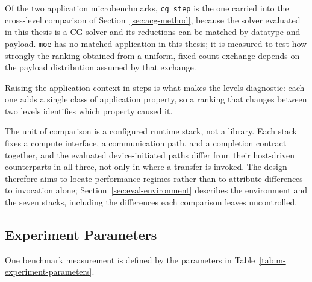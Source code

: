 Of the two application microbenchmarks, \texttt{cg\_step} is the one carried into the cross-level comparison of Section~\ref{sec:acg-method}, because the solver evaluated in this thesis is a CG solver and its reductions can be matched by datatype and payload. \texttt{moe} has no matched application in this thesis; it is measured to test how strongly the ranking obtained from a uniform, fixed-count exchange depends on the payload distribution assumed by that exchange.

Raising the application context in steps is what makes the levels diagnostic: each one adds a single class of application property, so a ranking that changes between two levels identifies which property caused it.

The unit of comparison is a configured runtime stack, not a library. Each stack fixes a compute interface, a communication path, and a completion contract together, and the evaluated device-initiated paths differ from their host-driven counterparts in all three, not only in where a transfer is invoked. The design therefore aims to locate performance regimes rather than to attribute differences to invocation alone; Section~\ref{sec:eval-environment} describes the environment and the seven stacks, including the differences each comparison leaves uncontrolled.

\subsection{Experiment Parameters}\label{sec:execution-procedure}

One benchmark measurement is defined by the parameters in Table~\ref{tab:m-experiment-parameters}.

